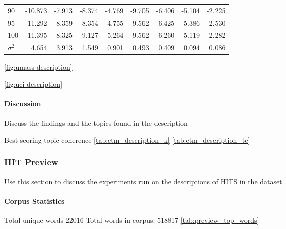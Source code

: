 \documentclass[letterpaper,12pt]{article}
\begin{document}
\begin{table}
\begin{center}
\begin{tabular}{|l|rr|rr|rr|rr|}
			90  & -10.873 & -7.913 & -8.374 & -4.769 &  -9.705 & -6.406 & -5.104 & -2.225 \\
			95  & -11.292 & -8.359 & -8.354 & -4.755 &  -9.562 & -6.425 & -5.386 & -2.530 \\
			100 & -11.395 & -8.325 & -9.127 & -5.264 &  -9.562 & -6.260 & -5.119 & -2.282 \\
			\hline
			$\sigma^2$ & 4.654 & 3.913 & 1.549 & 0.901 & 0.493 & 0.409 & 0.094 & 0.086 \\ 
			\hline
			\end{tabular}
	\end{center}
\end{table}

\ref{fig:umass-description}

\ref{fig:uci-description}

\newpage

\paragraph{Discussion}

Discuss the findings and the topics found in the description

Best scoring topic coherence \ref{tab:etm_description_k} \ref{tab:etm_description_tc}


\subsubsection{HIT Preview}
Use this section to discuss the experiments run on the descriptions of HITS in the dataset

\paragraph{Corpus Statistics}
Total unique words 22016
Total words in corpus: 518817
\ref{tab:preview_top_words}
\end{document}
